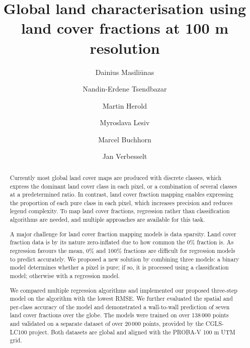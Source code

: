 \documentclass[review,authoryear,3p]{elsarticle}
\begin{document}
\begin{frontmatter} %

\title{Global land characterisation using land cover fractions at 100 m resolution}

\author[WURGRS]{Dainius Masili\={u}nas}

\author[WURGRS]{Nandin-Erdene Tsendbazar}

\author[WURGRS]{Martin Herold}

\author[IIASA]{Myroslava Lesiv}

\author[VITO]{Marcel Buchhorn}

\author[WURGRS]{Jan Verbesselt}

\address[WURGRS]{Wageningen University \& Research, Laboratory of Geo-Information Science and Remote Sensing, Droevendaalsesteeg 3, 6708 PB Wageningen, the Netherlands}
\address[IIASA]{International Institute for Applied Systems Analysis (IIASA), Schlossplatz 1, A-2361 Laxenburg, Austria}
\address[VITO]{Flemish Institute for Technological Research (VITO), Boeretang 200, BE-2400 Mol, Belgium}

\begin{abstract} %
Currently most global land cover maps are produced with discrete classes, which express the dominant land cover class in each pixel, or a combination of several classes at a predetermined ratio. In contrast, land cover fraction mapping enables expressing the proportion of each pure class in each pixel, which increases precision and reduces legend complexity. To map land cover fractions, regression rather than classification algorithms are needed, and multiple approaches are available for this task.

A major challenge for land cover fraction mapping models is data sparsity. Land cover fraction data is by its nature zero-inflated due to how common the 0\% fraction is. As regression favours the mean, 0\% and 100\% fractions are difficult for regression models to predict accurately. We proposed a new solution by combining three models: a binary model determines whether a pixel is pure; if so, it is processed using a classification model; otherwise with a regression model.

We compared multiple regression algorithms and implemented our proposed three-step model on the algorithm with the lowest RMSE.
We further evaluated the spatial and per-class accuracy of the model and demonstrated a wall-to-wall prediction of seven land cover fractions over the globe. 
The models were trained on over 138\,000 points and validated on a separate dataset of over 20\,000 points, provided by the \gls{CGLS-LC100} project. Both datasets are global and aligned with the PROBA-V 100 m UTM grid.


\end{abstract}
\end{frontmatter}
\end{document}
